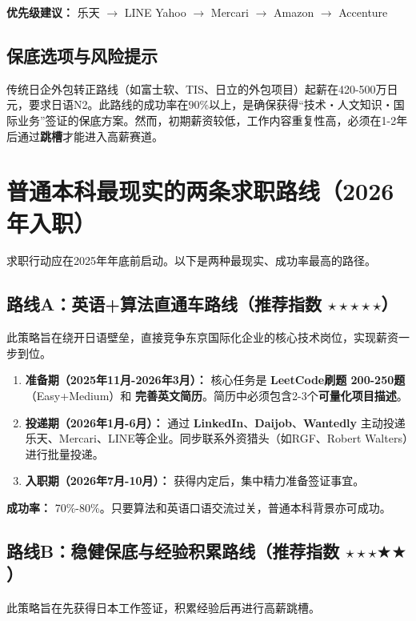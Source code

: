 \documentclass[12pt, a4paper]{ctexart}
\begin{document}
\textbf{优先级建议：} 乐天 $\rightarrow$ LINE Yahoo $\rightarrow$ Mercari $\rightarrow$ Amazon $\rightarrow$ Accenture

\subsection{保底选项与风险提示}

传统日企外包转正路线（如富士软、TIS、日立的外包项目）起薪在420-500万日元，要求日语N2。此路线的成功率在90\%以上，是确保获得“技术・人文知识・国际业务”签证的保底方案。然而，初期薪资较低，工作内容重复性高，必须在1-2年后通过\textbf{跳槽}才能进入高薪赛道。

\section{普通本科最现实的两条求职路线（2026年入职）}

求职行动应在2025年年底前启动。以下是两种最现实、成功率最高的路径。

\subsection{路线A：英语+算法直通车路线（推荐指数 $\star\star\star\star\star$）}

此策略旨在绕开日语壁垒，直接竞争东京国际化企业的核心技术岗位，实现薪资一步到位。

\begin{enumerate}
    \item \textbf{准备期（2025年11月-2026年3月）：} 核心任务是 \textbf{LeetCode刷题 200-250题}（Easy+Medium）和 \textbf{完善英文简历}。简历中必须包含2-3个\textbf{可量化项目描述}。
    \item \textbf{投递期（2026年1月-6月）：} 通过 \textbf{LinkedIn}、\textbf{Daijob}、\textbf{Wantedly} 主动投递乐天、Mercari、LINE等企业。同步联系外资猎头（如RGF、Robert Walters）进行批量投递。
    \item \textbf{入职期（2026年7月-10月）：} 获得内定后，集中精力准备签证事宜。
\end{enumerate}
\textbf{成功率：} 70\%-80\%。只要算法和英语口语交流过关，普通本科背景亦可成功。

\subsection{路线B：稳健保底与经验积累路线（推荐指数 $\star\star\star\bigstar\bigstar$）}

此策略旨在先获得日本工作签证，积累经验后再进行高薪跳槽。
\end{document}
